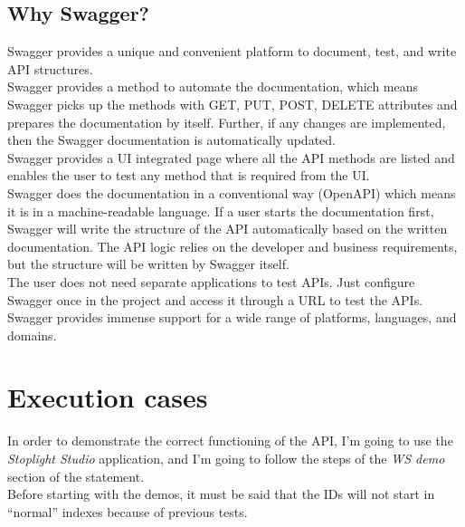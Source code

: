 \documentclass[a4paper,12pt]{article}
\begin{document}
\subsection*{Why Swagger?}
Swagger provides a unique and convenient platform to document, test, and write API structures.\\
Swagger provides a method to automate the documentation, which means Swagger picks up the methods with GET, PUT, POST, DELETE attributes and prepares the documentation by itself. Further, if any changes are implemented, then the Swagger documentation is automatically updated.\\
Swagger provides a UI integrated page where all the API methods are listed and enables the user to test any method that is required from the UI.\\
Swagger does the documentation in a conventional way (OpenAPI) which means it is in a machine-readable language. If a user starts the documentation first, Swagger will write the structure of the API automatically based on the written documentation. The API logic relies on the developer and business requirements, but the structure will be written by Swagger itself.\\
The user does not need separate applications to test APIs. Just configure Swagger once in the project and access it through a URL to test the APIs.\\
Swagger provides immense support for a wide range of platforms, languages, and domains.
\section*{Execution cases}
In order to demonstrate the correct functioning of the API, I'm going to use the \textit{Stoplight Studio} application, and I'm going to follow the steps of the \textit{WS demo} section of the statement.\\
Before starting with the demos, it must be said that the IDs will not start in “normal” indexes because of previous tests.
\newpage
\end{document}
